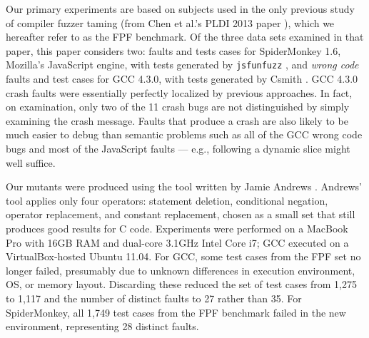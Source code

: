 



Our primary experiments are based on subjects used in the only previous study of compiler fuzzer taming (from Chen et al.'s PLDI 2013 paper \cite{PLDI13}), which we hereafter refer to as the FPF benchmark.  Of the three data sets examined in that paper, this paper considers two:  faults and tests cases for SpiderMonkey 1.6, Mozilla's JavaScript engine, with tests generated by {\tt jsfunfuzz} \cite{jsfunfuzz}, and \emph{wrong code} faults and test cases for GCC 4.3.0, with tests generated by Csmith \cite{csmith}.  GCC 4.3.0 crash faults were essentially perfectly localized by previous approaches.  In fact, on examination, only two of the 11 crash bugs are not distinguished by simply examining the crash message.  Faults that produce a crash are also likely to be much easier to debug than semantic problems such as all of the GCC wrong code bugs and most of the JavaScript faults --- e.g., following a dynamic slice might well suffice.

Our mutants were produced using the tool written by Jamie Andrews \cite{mutant}.  Andrews' tool applies only four operators: statement deletion, conditional negation, operator replacement, and constant replacement, chosen as a small set that still produces good results for C code.  Experiments were performed on a MacBook Pro with 16GB RAM and dual-core 3.1GHz Intel Core i7; GCC executed on a VirtualBox-hosted Ubuntu 11.04.  For GCC, some test cases from the FPF set no longer failed, presumably due to unknown differences in execution environment, OS, or memory layout. Discarding these reduced the set of test cases from 1,275 to 1,117 and the number of distinct faults to 27 rather than 35.  For SpiderMonkey, all 1,749 test cases from the FPF benchmark failed in the new environment, representing 28 distinct faults.


